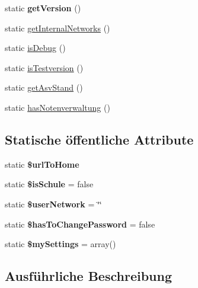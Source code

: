 \begin{DoxyCompactItemize}
\item 
\mbox{\label{class_d_b_a3123f3198f4796560873f294c15c0698}} 
static {\bfseries get\+Version} ()
\item 
static \mbox{\hyperlink{class_d_b_a422aa16764ad5b26d960fd9ba5978458}{get\+Internal\+Networks}} ()
\item 
static \mbox{\hyperlink{class_d_b_a88339147447cac62cd91dbfe2cc4a852}{is\+Debug}} ()
\item 
static \mbox{\hyperlink{class_d_b_af81dc9b99fb7289bfd817cc0b91b5e0d}{is\+Testversion}} ()
\item 
static \mbox{\hyperlink{class_d_b_a1ebd9dfeb83ffaddd5ae46689586b63d}{get\+Asv\+Stand}} ()
\item 
static \mbox{\hyperlink{class_d_b_ac2a93cc21007d82274796aef19353bb8}{has\+Notenverwaltung}} ()
\end{DoxyCompactItemize}
\subsection*{Statische öffentliche Attribute}
\begin{DoxyCompactItemize}
\item 
\mbox{\label{class_d_b_a50cb803292332578be902a20bb3857a1}} 
static {\bfseries \$url\+To\+Home}
\item 
\mbox{\label{class_d_b_a7ffa05fce4d8d49663bf44158a7a2ec6}} 
static {\bfseries \$is\+Schule} = false
\item 
\mbox{\label{class_d_b_aeacdc66cb058fba441cad3714231616d}} 
static {\bfseries \$user\+Network} = \char`\"{}\char`\"{}
\item 
\mbox{\label{class_d_b_a922e6ee0a1c97170026786745da12af8}} 
static {\bfseries \$has\+To\+Change\+Password} = false
\item 
\mbox{\label{class_d_b_a052937257a352fda8f0ef43361445a13}} 
static {\bfseries \$my\+Settings} = array()
\end{DoxyCompactItemize}


\subsection{Ausführliche Beschreibung}


